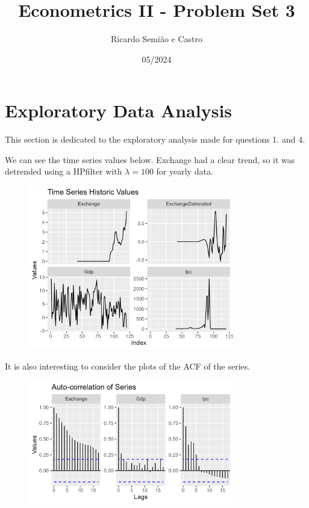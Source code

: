 \documentclass[12pt]{article}
\title{Econometrics II - Problem Set 3}
\author{Ricardo Semião e Castro}
\date{05/2024}
\begin{document}
\maketitle

\section*{Exploratory Data Analysis}

This section is dedicated to the exploratory analysis made for questions 1. and 4.

We can see the time series values below. Exchange had a clear trend, so it was detrended using a HPfilter with $\lambda = 100$ for yearly data.

\begin{figure}[H]
    \centering
    \includegraphics[width=0.8\textwidth]{figures/explore_values.png}
\end{figure}

It is also interesting to consider the plots of the ACF of the series.

\begin{figure}[H]
    \centering
    \includegraphics[width=0.8\textwidth]{figures/explore_acf.png}
\end{figure}
\end{document}
